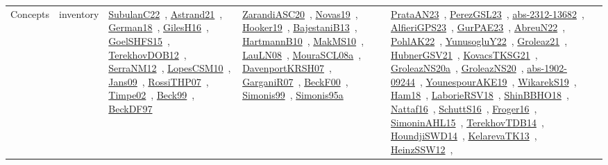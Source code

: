 {\begin{longtable}{lp{3cm}>{\raggedright\arraybackslash}p{6cm}>{\raggedright\arraybackslash}p{6cm}>{\raggedright\arraybackslash}p{8cm}}
Concepts & inventory & \href{works/SubulanC22.pdf}{SubulanC22}~\cite{SubulanC22}, \href{works/Astrand21.pdf}{Astrand21}~\cite{Astrand21}, \href{works/German18.pdf}{German18}~\cite{German18}, \href{works/GilesH16.pdf}{GilesH16}~\cite{GilesH16}, \href{works/GoelSHFS15.pdf}{GoelSHFS15}~\cite{GoelSHFS15}, \href{works/TerekhovDOB12.pdf}{TerekhovDOB12}~\cite{TerekhovDOB12}, \href{works/SerraNM12.pdf}{SerraNM12}~\cite{SerraNM12}, \href{works/LopesCSM10.pdf}{LopesCSM10}~\cite{LopesCSM10}, \href{works/Jans09.pdf}{Jans09}~\cite{Jans09}, \href{works/RossiTHP07.pdf}{RossiTHP07}~\cite{RossiTHP07}, \href{works/Timpe02.pdf}{Timpe02}~\cite{Timpe02}, \href{works/Beck99.pdf}{Beck99}~\cite{Beck99}, \href{works/BeckDF97.pdf}{BeckDF97}~\cite{BeckDF97} & \href{works/ZarandiASC20.pdf}{ZarandiASC20}~\cite{ZarandiASC20}, \href{works/Novas19.pdf}{Novas19}~\cite{Novas19}, \href{works/Hooker19.pdf}{Hooker19}~\cite{Hooker19}, \href{works/BajestaniB13.pdf}{BajestaniB13}~\cite{BajestaniB13}, \href{works/HartmannB10.pdf}{HartmannB10}~\cite{HartmannB10}, \href{works/MakMS10.pdf}{MakMS10}~\cite{MakMS10}, \href{works/LauLN08.pdf}{LauLN08}~\cite{LauLN08}, \href{works/MouraSCL08a.pdf}{MouraSCL08a}~\cite{MouraSCL08a}, \href{works/DavenportKRSH07.pdf}{DavenportKRSH07}~\cite{DavenportKRSH07}, \href{works/GarganiR07.pdf}{GarganiR07}~\cite{GarganiR07}, \href{works/BeckF00.pdf}{BeckF00}~\cite{BeckF00}, \href{works/Simonis99.pdf}{Simonis99}~\cite{Simonis99}, \href{works/Simonis95a.pdf}{Simonis95a}~\cite{Simonis95a} & \href{works/PrataAN23.pdf}{PrataAN23}~\cite{PrataAN23}, \href{works/PerezGSL23.pdf}{PerezGSL23}~\cite{PerezGSL23}, \href{works/abs-2312-13682.pdf}{abs-2312-13682}~\cite{abs-2312-13682}, \href{works/AlfieriGPS23.pdf}{AlfieriGPS23}~\cite{AlfieriGPS23}, \href{works/GurPAE23.pdf}{GurPAE23}~\cite{GurPAE23}, \href{works/AbreuN22.pdf}{AbreuN22}~\cite{AbreuN22}, \href{works/PohlAK22.pdf}{PohlAK22}~\cite{PohlAK22}, \href{works/YunusogluY22.pdf}{YunusogluY22}~\cite{YunusogluY22}, \href{works/Groleaz21.pdf}{Groleaz21}~\cite{Groleaz21}, \href{works/HubnerGSV21.pdf}{HubnerGSV21}~\cite{HubnerGSV21}, \href{works/KovacsTKSG21.pdf}{KovacsTKSG21}~\cite{KovacsTKSG21}, \href{works/GroleazNS20a.pdf}{GroleazNS20a}~\cite{GroleazNS20a}, \href{works/GroleazNS20.pdf}{GroleazNS20}~\cite{GroleazNS20}, \href{works/abs-1902-09244.pdf}{abs-1902-09244}~\cite{abs-1902-09244}, \href{works/YounespourAKE19.pdf}{YounespourAKE19}~\cite{YounespourAKE19}, \href{works/WikarekS19.pdf}{WikarekS19}~\cite{WikarekS19}, \href{works/Ham18.pdf}{Ham18}~\cite{Ham18}, \href{works/LaborieRSV18.pdf}{LaborieRSV18}~\cite{LaborieRSV18}, \href{works/ShinBBHO18.pdf}{ShinBBHO18}~\cite{ShinBBHO18}, \href{works/Nattaf16.pdf}{Nattaf16}~\cite{Nattaf16}, \href{works/SchuttS16.pdf}{SchuttS16}~\cite{SchuttS16}, \href{works/Froger16.pdf}{Froger16}~\cite{Froger16}, \href{works/SimoninAHL15.pdf}{SimoninAHL15}~\cite{SimoninAHL15}, \href{works/TerekhovTDB14.pdf}{TerekhovTDB14}~\cite{TerekhovTDB14}, \href{works/HoundjiSWD14.pdf}{HoundjiSWD14}~\cite{HoundjiSWD14}, \href{works/KelarevaTK13.pdf}{KelarevaTK13}~\cite{KelarevaTK13}, \href{works/HeinzSSW12.pdf}{HeinzSSW12}~\cite{HeinzSSW12}, 
\end{longtable}}
